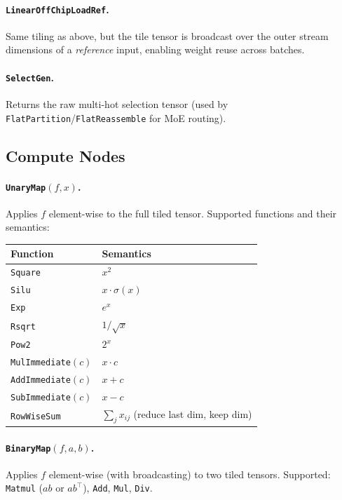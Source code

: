 \documentclass[11pt]{article}
\begin{document}
\paragraph{\texttt{LinearOffChipLoadRef}.}
Same tiling as above, but the tile tensor is broadcast over the outer stream dimensions of a \emph{reference} input, enabling weight reuse across batches.

\paragraph{\texttt{SelectGen}.}
Returns the raw multi-hot selection tensor (used by \texttt{FlatPartition}/\texttt{FlatReassemble} for MoE routing).

\subsection{Compute Nodes}

\paragraph{\texttt{UnaryMap}$(f, x)$.}
Applies $f$ element-wise to the full tiled tensor.
Supported functions and their semantics:

\begin{center}
\begin{tabular}{ll}
\toprule
\textbf{Function} & \textbf{Semantics} \\
\midrule
\texttt{Square}         & $x^2$ \\
\texttt{Silu}           & $x \cdot \sigma(x)$ \\
\texttt{Exp}            & $e^x$ \\
\texttt{Rsqrt}          & $1/\sqrt{x}$ \\
\texttt{Pow2}           & $2^x$ \\
\texttt{MulImmediate}$(c)$ & $x \cdot c$ \\
\texttt{AddImmediate}$(c)$ & $x + c$ \\
\texttt{SubImmediate}$(c)$ & $x - c$ \\
\texttt{RowWiseSum}     & $\sum_j x_{ij}$ (reduce last dim, keep dim) \\
\bottomrule
\end{tabular}
\end{center}

\paragraph{\texttt{BinaryMap}$(f, a, b)$.}
Applies $f$ element-wise (with broadcasting) to two tiled tensors.
Supported: \texttt{Matmul} ($ab$ or $ab^\top$), \texttt{Add}, \texttt{Mul}, \texttt{Div}.
\end{document}
